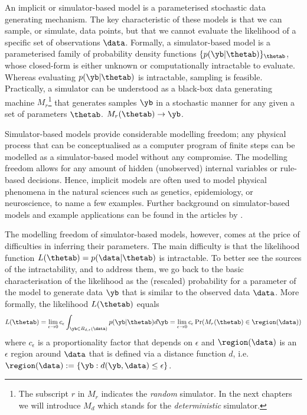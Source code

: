An implicit or simulator-based model is a parameterised stochastic
data generating mechanism. The key characteristic of these models is
that we can sample, or simulate, data points, but that we cannot
evaluate the likelihood of a specific set of observations
$\data$. Formally, a simulator-based model is a parameterised family
of probability density functions $\{ p(\yb|\thetab) \}_{\thetab}$,
whose closed-form is either unknown or computationally intractable to
evaluate. Whereas evaluating $p(\yb|\thetab)$ is intractable, sampling
is feasible. Practically, a simulator can be understood as a black-box
data generating machine $M_r$\footnote{The subscript $r$ in $M_r$
indicates the \textit{random} simulator. In the next chapters we will
introduce $M_d$ which stands for the \textit{deterministic}
simulator.} that generates samples $\yb$ in a stochastic manner for
any given a set of parameters $\thetab$.%
$M_r(\thetab) \rightarrow \yb$.

Simulator-based models provide considerable modelling freedom; any
physical process that can be conceptualised as a computer program of
finite steps can be modelled as a simulator-based model without any
compromise. The modelling freedom allows for any amount of hidden
(unobserved) internal variables or rule-based decisions. Hence,
implicit models are often used to model physical phenomena in the
natural sciences such as genetics, epidemiology, or neuroscience, to
name a few examples. Further background on simulator-based models and
example applications can be found in the articles
by \citet{Gutmann2016, Lintusaari2017, Sisson2018, Cranmer2020}.


The modelling freedom of simulator-based models, however, comes at the
price of difficulties in inferring their parameters. The main
difficulty is that the likelihood function $L(\thetab) =
p(\data|\thetab)$ is intractable. To better see the sources of the
intractability, and to address them, we go back to the basic
characterisation of the likelihood as the (rescaled) probability for a
parameter of the model to generate data $\yb$ that is similar to the
observed data $\data$. More formally, the likelihood $L(\thetab)$
equals
\begin{equation} \label{eq:likelihood}
  L(\thetab) = \lim_{\epsilon \to 0} c_\epsilon \int_{\yb \in B_{d,\epsilon}(\data)} p(\yb|\thetab)d\yb =
  \lim_{\epsilon \to 0} c_\epsilon \Pr(M_r(\thetab) \in \region(\data))
\end{equation}
where $c_\epsilon$ is a proportionality factor that depends on
$\epsilon$ and $\region(\data)$ is an $\epsilon$ region around $\data$
that is defined via a distance function $d$, i.e.\ $\region(\data)
:= \{\yb: d(\yb, \data) \leq \epsilon \}$. 


